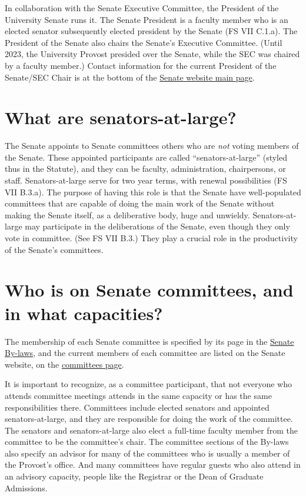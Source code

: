\documentclass[12pt]{article}
\begin{document}
In collaboration with the Senate Executive Committee, the President of
the University Senate runs it. The Senate President is a faculty member
who is an elected senator subsequently elected president by the Senate
(FS VII C.1.a). The President of the Senate also chairs the Senate's
Executive Committee. (Until 2023, the University Provost presided over
the Senate, while the SEC was chaired by a faculty member.) Contact
information for the current President of the Senate/SEC Chair is at the
bottom of the \href{https://www.hofstra.edu/senate/}{Senate website main
page}.

\section{What are senators-at-large?}\label{what-are-senators-at-large}

The Senate appoints to Senate committees others who are \emph{not}
voting members of the Senate. These appointed participants are called
``senators-at-large'' (styled thus in the Statute), and they can be
faculty, administration, chairpersons, or staff. Senators-at-large serve
for two year terms, with renewal possibilities (FS VII B.3.a). The
purpose of having this role is that the Senate have well-populated
committees that are capable of doing the main work of the Senate without
making the Senate itself, as a deliberative body, huge and unwieldy.
Senators-at-large may participate in the deliberations of the Senate,
even though they only vote in committee. (See FS VII B.3.) They play a
crucial role in the productivity of the Senate's committees.

\section{Who is on Senate committees, and in what
capacities?}\label{who-is-on-senate-committees-and-in-what-capacities}

The membership of each Senate committee is specified by its page in the
\href{https://www.hofstra.edu/sites/default/files/2022-04/senatebylaws.pdf}{Senate
By-laws}, and the current members of each committee are listed on the
Senate website, on the
\href{https://www.hofstra.edu/senate/committees-subcommittees.html}{committees
page}.

It is important to recognize, as a committee participant, that not
everyone who attends committee meetings attends in the same capacity or
has the same responsibilities there. Committees include elected senators
and appointed senators-at-large, and they are responsible for doing the
work of the committee. The senators and senators-at-large also elect a
full-time faculty member from the committee to be the committee's chair.
The committee sections of the By-laws also specify an advisor for many
of the committees who is usually a member of the Provost's office. And
many committees have regular guests who also attend in an advisory
capacity, people like the Registrar or the Dean of Graduate Admissions.
\end{document}

